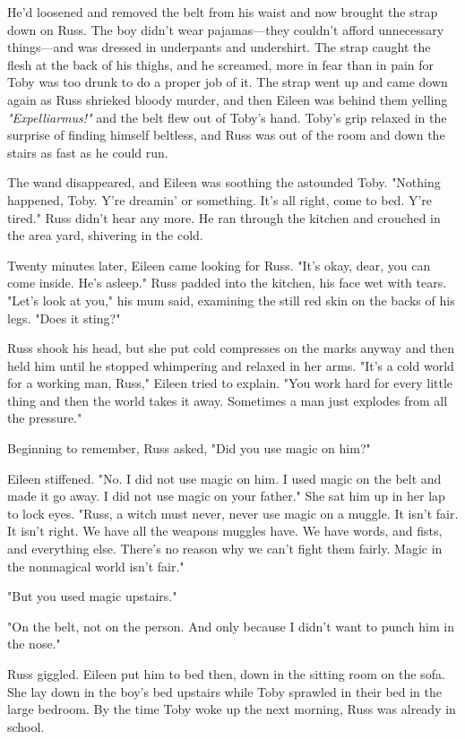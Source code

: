 He'd loosened and removed the belt from his waist and now brought the strap down on Russ. The boy didn't wear pajamas—they couldn't afford unnecessary things—and was dressed in underpants and undershirt. The strap caught the flesh at the back of his thighs, and he screamed, more in fear than in pain for Toby was too drunk to do a proper job of it. The strap went up and came down again as Russ shrieked bloody murder, and then Eileen was behind them yelling \emph{"Expelliarmus!"} and the belt flew out of Toby's hand. Toby's grip relaxed in the surprise of finding himself beltless, and Russ was out of the room and down the stairs as fast as he could run.

The wand disappeared, and Eileen was soothing the astounded Toby. "Nothing happened, Toby. Y're dreamin' or something. It's all right, come to bed. Y're tired." Russ didn't hear any more. He ran through the kitchen and crouched in the area yard, shivering in the cold.

Twenty minutes later, Eileen came looking for Russ. "It's okay, dear, you can come inside. He's asleep." Russ padded into the kitchen, his face wet with tears. "Let's look at you," his mum said, examining the still red skin on the backs of his legs. "Does it sting?"

Russ shook his head, but she put cold compresses on the marks anyway and then held him until he stopped whimpering and relaxed in her arms. "It's a cold world for a working man, Russ," Eileen tried to explain. "You work hard for every little thing and then the world takes it away. Sometimes a man just explodes from all the pressure."

Beginning to remember, Russ asked, "Did you use magic on him?"

Eileen stiffened. "No. I did not use magic on him. I used magic on the belt and made it go away. I did not use magic on your father." She sat him up in her lap to lock eyes. "Russ, a witch must never, never use magic on a muggle. It isn't fair. It isn't right. We have all the weapons muggles have. We have words, and fists, and everything else. There's no reason why we can't fight them fairly. Magic in the nonmagical world isn't fair."

"But you used magic upstairs."

"On the belt, not on the person. And only because I didn't want to punch him in the nose."

Russ giggled. Eileen put him to bed then, down in the sitting room on the sofa. She lay down in the boy's bed upstairs while Toby sprawled in their bed in the large bedroom. By the time Toby woke up the next morning, Russ was already in school.

